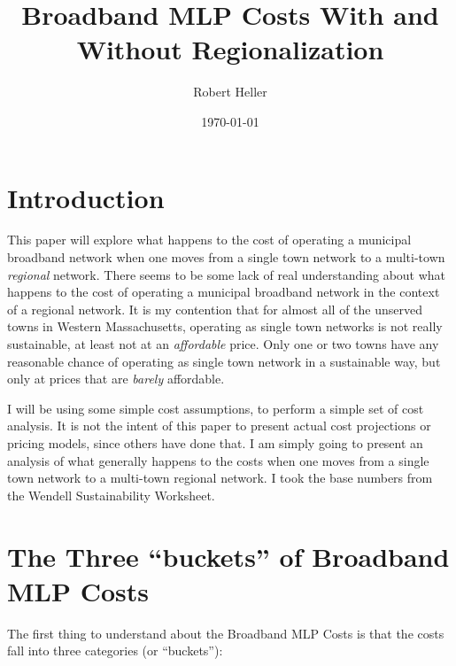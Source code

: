 \documentclass[12pt]{article}
\title{Broadband MLP Costs With and Without Regionalization}
\author{Robert Heller}
\date{\today}
\begin{document}
\maketitle

\tableofcontents
\listoffigures
\listoftables


\section{Introduction}

This paper will explore what happens to the cost of operating a municipal 
broadband network when one moves from a single town network to a multi-town 
\textit{regional} network.  There seems to be some lack of real understanding 
about what happens to the cost of operating a municipal broadband network in 
the context of a regional network.  It is my contention that for almost all of 
the unserved towns in Western Massachusetts, operating as single town networks 
is not really sustainable, at least not at an \textit{affordable} price.  Only 
one or two towns have any reasonable chance of operating as single town 
network in a sustainable way, but only at prices that are \textit{barely} 
affordable.

I will be using some simple cost assumptions, to perform a simple set of cost
analysis. It is not the intent of this paper to present actual cost
projections or pricing models, since others have done that. I am simply going
to present an analysis of what generally happens to the costs when one moves
from a single town network to a multi-town regional network.  I took the base 
numbers from the Wendell Sustainability Worksheet\cite{WendSustain}.

\section{The Three ``buckets'' of Broadband MLP Costs}

The first thing to understand about the Broadband MLP Costs is that the costs 
fall into three categories (or ``buckets''):
\end{document}
